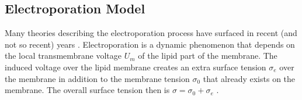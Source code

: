 \documentclass[english,12pt]{article}
\begin{document}
\subsection{Electroporation Model}
Many theories describing the electroporation process have surfaced in recent (and not so recent) years \citep{Weaver1996135,Zimmermann1974881,DeBruin19991213}. Electroporation is a dynamic phenomenon that depends on the local transmembrane voltage $U_{m}$ of the lipid part of the membrane. The induced voltage over the lipid membrane creates an extra surface tension $\sigma_{e}$ over the membrane in addition to the membrane tension $\sigma_0$ that already exists on the membrane. The overall surface tension then is $\sigma=\sigma_0+\sigma_e$ .
\end{document}
